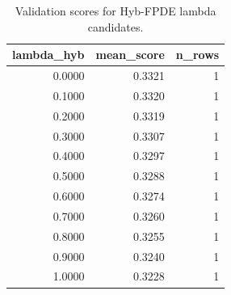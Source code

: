 \begin{table}[t]
\caption{Validation scores for Hyb-FPDE lambda candidates.}
\label{tab:lambda_distribution_computed}
\centering
\begin{tabular}{rrr}
\toprule
lambda\_hyb & mean\_score & n\_rows \\
\midrule
0.0000 & 0.3321 & 1 \\
0.1000 & 0.3320 & 1 \\
0.2000 & 0.3319 & 1 \\
0.3000 & 0.3307 & 1 \\
0.4000 & 0.3297 & 1 \\
0.5000 & 0.3288 & 1 \\
0.6000 & 0.3274 & 1 \\
0.7000 & 0.3260 & 1 \\
0.8000 & 0.3255 & 1 \\
0.9000 & 0.3240 & 1 \\
1.0000 & 0.3228 & 1 \\
\bottomrule
\end{tabular}

\end{table}
